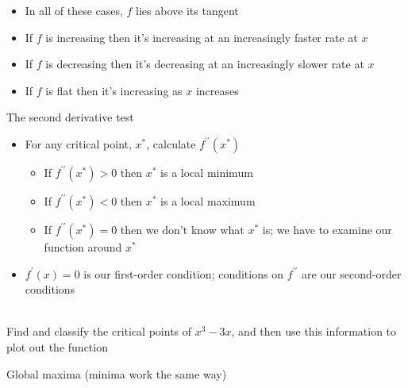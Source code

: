 \documentclass[10pt]{seminar}
\begin{document}
\begin{slide}
\begin{itemize}
\begin{itemize}
\end{itemize}
\item In all of these cases, $f$ lies above its tangent
\end{itemize}

\newslide

\begin{itemize}

\item[A] If $f$ is increasing then it's increasing at an increasingly faster rate at $x$
\item[B] If $f$ is decreasing then it's decreasing at an increasingly slower rate at $x$
\item[C] If $f$ is flat then it's increasing as $x$ increases

\end{itemize}

\vspace{.2in}
\begin{center}
\end{center}

\newslide

The second derivative test

\begin{itemize}
\item For any critical point, $x^*$, calculate $f^{\prime\prime}(x^*)$

\begin{itemize}
\item If $f^{\prime\prime}(x^*)>0$ then $x^*$ is a local minimum
\item If $f^{\prime\prime}(x^*)<0$ then $x^*$ is a local maximum

\item If $f^{\prime\prime}(x^*)=0$ then we don't know what $x^*$ is; we have to examine our function around $x^*$

\end{itemize}

\item $f^\prime(x)=0$ is our first-order condition; conditions on $f^{\prime\prime}$ are our second-order conditions

\end{itemize}


\ \\Find and classify the critical points of $x^3-3x$, and then use this information to plot out the function

\newslide

Global maxima (minima work the same way)


\end{slide}
\end{document}
